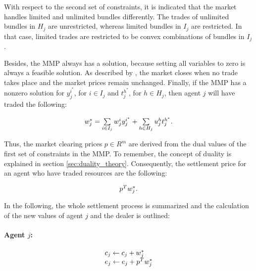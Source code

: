 With respect to the second set of constraints, it is indicated that the market handles limited and unlimited bundles differently. The trades of unlimited bundles in $H_{j}$ are unrestricted, whereas limited bundles in $I_{j}$
are restricted. In that case, limited trades are restricted to be convex combinations of bundles in $I_{j}$.

Besides, the MMP always has a solution, because setting all variables to zero 
is always a feasible solution. As described by , the market closes when no trade takes place 
and the market prices remain unchanged. Finally, if the MMP has a nonzero solution for
 $y_{j}^{i^{*}}$, for $i \in I_{j}$ and $t_{j}^{h^{*}}$, for $h \in H_{j}$, then agent $j$ will have traded the following:

 \begin{equation*}
 \begin{array}{ll@{}ll}
 w_{j}^{*} = 
 \sum\limits_{i \in I_{j}}^{} w_{j}^{i}y_{j}^{i^{*}} + 
 \sum\limits_{h \in H_{j}}^{} u_{j}^{h}t_{j}^{h^{*}}.
 \end{array}
\end{equation*}

Thus, the market clearing prices $p \in R^{m}$ are derived from the dual values of the first set of constraints in the MMP. 
To remember, the concept of duality is explained in section \ref{sec:duality_theory}.
Consequently, the settlement price for an agent who have traded resources are the following:

\begin{equation*}
 \begin{array}{ll@{}ll}
 p^{T} w_{j}^{*}.
 \end{array}
\end{equation*}

In the following, the whole settlement process is summarized and the calculation of the new values of agent $j$ and the dealer 
is outlined:

\paragraph*{Agent $j$:}
\begin{equation*}
 \begin{array}{ll@{}ll}
 c_{j} \leftarrow c_{j} + w_{j}^{*} \\
 e_{j} \leftarrow e_{j} + p^{T} w_{j}^{*} \\
 \end{array}
\end{equation*}


